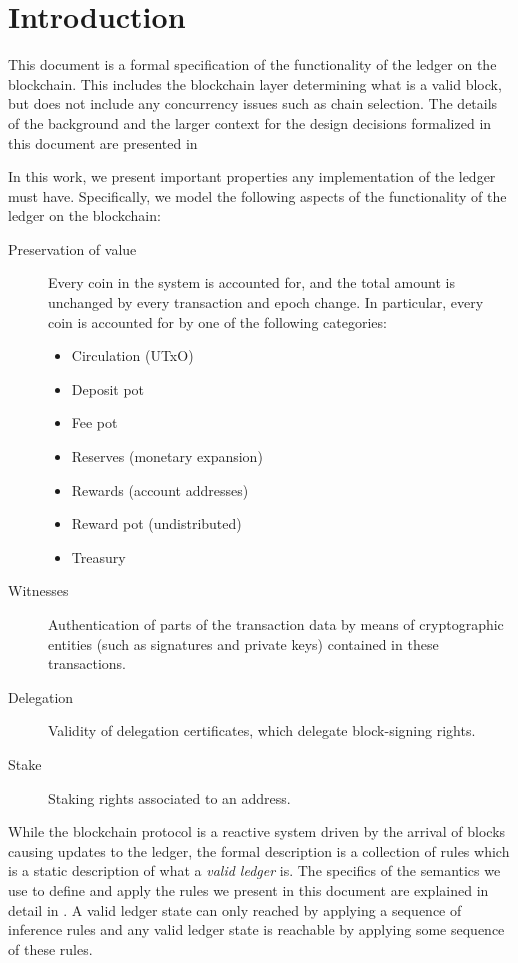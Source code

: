 \section{Introduction}
\label{sec:introduction-shelley}

This document is a formal specification of the functionality of the ledger on the blockchain.
This includes the blockchain layer determining what is a valid block,
but does not include any concurrency issues such as chain selection.
The details of the background and the larger context
for the design decisions formalized in this document are presented
in~\cite{delegation_design}

In this work,
we present important properties any implementation of the ledger must have.
Specifically, we model the following aspects
of the functionality of the ledger on the blockchain:

\begin{description}
\item[Preservation of value] Every coin in the system is accounted for,
  and the total amount is unchanged by every transaction and epoch change.
  In particular, every coin is accounted for by one of the following categories:
  \begin{itemize}
    \item Circulation (UTxO)
    \item Deposit pot
    \item Fee pot
    \item Reserves (monetary expansion)
    \item Rewards (account addresses)
    \item Reward pot (undistributed)
    \item Treasury
  \end{itemize}
\item[Witnesses] Authentication of parts of the transaction data by means of
  cryptographic entities (such as signatures and private keys) contained in
  these transactions.
\item[Delegation] Validity of delegation certificates, which delegate
  block-signing rights.
\item[Stake] Staking rights associated to an address.
\end{description}

While the blockchain protocol is a reactive system driven by the arrival
of blocks causing updates to the ledger, the formal description is a collection
of rules which is a
static description of what a \textit{valid ledger} is. The specifics of the
semantics we use to define and apply
the rules we present in this document are explained in detail in
\cite{small_step_semantics}. A valid ledger state can only
reached by applying a sequence of inference rules and any valid ledger state
is reachable by applying some sequence of these rules.

